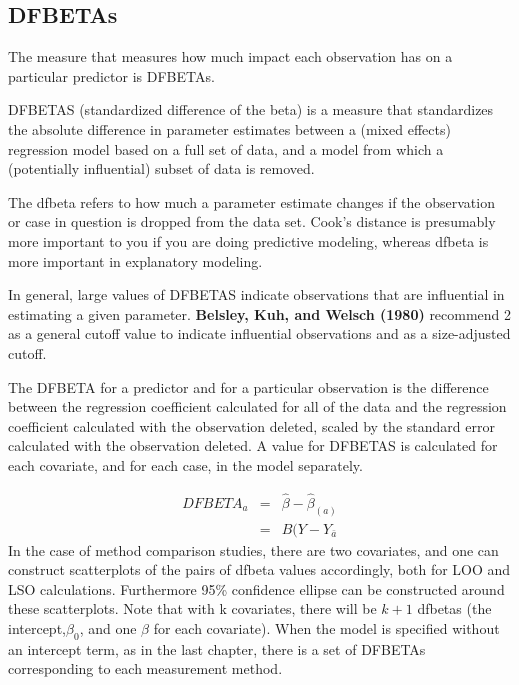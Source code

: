 \documentclass[12pt, a4paper]{report}
\theoremstyle{plain}
\theoremstyle{definition}
\theoremstyle{remark}
\begin{document}

\subsection{DFBETAs}
The measure that measures how much impact each observation has on a particular predictor is DFBETAs. 


DFBETAS (standardized difference of the beta) is a measure that standardizes the absolute difference in parameter estimates between a (mixed effects) regression model based on a full set of data, and a model from which a (potentially influential) subset of data is removed. 


The dfbeta refers to how much a parameter estimate changes if the observation or case in question is dropped from the data set.
Cook's distance is presumably more important to you if you are doing predictive modeling, whereas dfbeta is more important in explanatory modeling.

In general, large values of DFBETAS indicate observations that are influential in estimating a given parameter. \textbf{Belsley, Kuh, and Welsch (1980)} recommend 2 as a general cutoff value to indicate influential observations and  as a size-adjusted cutoff.

The DFBETA for a predictor and for a particular observation is the difference between the regression coefficient calculated for all of the data and the regression coefficient calculated with the observation deleted, scaled by the standard error calculated with the observation deleted. 
A value for DFBETAS is calculated for each covariate, and for each case, in the model separately.



\begin{eqnarray}
	DFBETA_{a} &=& \hat{\beta} - \hat{\beta}_{(a)} \\
	&=& B(Y-Y_{\bar{a}}
\end{eqnarray}
In the case of method comparison studies, there are two covariates, and one can construct scatterplots of the pairs of dfbeta values accordingly, both for LOO and LSO calculations. Furthermore 95\% confidence ellipse can be constructed around these scatterplots.
Note that with k covariates, there will be $k+1$ dfbetas (the intercept,$\beta_0$, and one $\beta$ for each covariate). When the model is specified without an intercept term, as in the last chapter, there is a set of DFBETAs corresponding to each measurement method.
\end{document}
